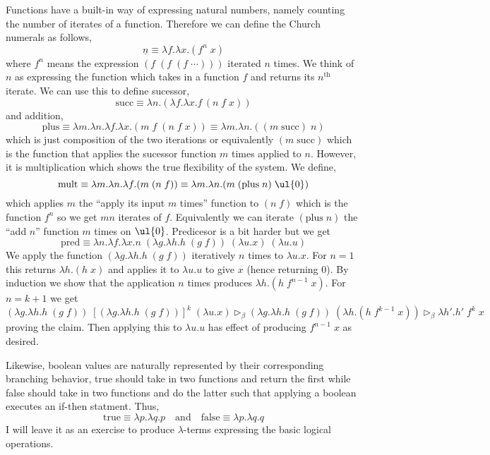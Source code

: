 \documentclass[12pt]{article}
\newcommand{\red}{\triangleright}
\newcommand{\bred}{\red_{\beta}}
\begin{document}
Functions have a built-in way of expressing natural numbers, namely counting the number of iterates of a function. Therefore we can define the Church numerals as follows,
\[ \underline{n} \equiv \lambda f . \lambda x . (f^n \; x) \]
where $f^n$ means the expression $(f \; (f \; (f \; \cdots)))$ iterated $n$ times. We think of $n$ as expressing the function which takes in a function $f$ and returns its $n^{\text{th}}$ iterate. We can use this to define sucessor,
\[ \text{succ} \equiv \lambda n . (\lambda f . \lambda x. f \, (n \; f \; x)) \]
and addition,
\[ \text{plus} \equiv \lambda m . \lambda n. \lambda f. \lambda x . (m \; f \; (n \; f \; x)) \equiv \lambda m . \lambda n . ((m \; \text{succ}) \; n) \]
which is just composition of the two iterations or equivalently $(m \; \text{succ})$ which is the function that applies the sucessor function $m$ times applied to $n$. However, it is multiplication which shows the true flexibility of the system. We define,
\[ \text{mult} \equiv \lambda m . \lambda n . \lambda f . (m \; (n \; f)) \equiv \lambda m . \lambda n . (m \; (\text{plus} \; n) \; \ul{0}) \]
which applies $m$ the ``apply its input $m$ times'' function to $(n \; f)$ which is the function $f^n$ so we get $mn$ iterates of $f$. Equivalently we can iterate $(\text{plus} \; n)$ the ``add $n$'' function $m$ times on $\ul{0}$. Predicesor is a bit harder but we get
\[ \text{pred} \equiv \lambda n. \lambda f. \lambda x. n \; (\lambda g . \lambda h . h \; (g \; f)) \; (\lambda u.x) \; (\lambda u . u) \]
We apply the function $(\lambda g . \lambda h . h \; (g \; f))$ iteratively $n$ times to $\lambda u.x$. For $n = 1$ this returns $\lambda h . (h \; x)$ and applies it to $\lambda u . u$ to give $x$ (hence returning $0$). By induction we show that the application $n$ times produces $\lambda h . (h \; f^{n-1} \; x)$. For $n = k+1$ we get 
\[ (\lambda g . \lambda h . h \; (g \; f)) \; [(\lambda g . \lambda h . h \; (g \; f))]^k \; (\lambda u.x) \bred (\lambda g . \lambda h . h \; (g \; f)) \; (\lambda h . (h \; f^{k-1} \; x)) \bred \lambda h' . h' \; f^k \; x  \]
proving the claim. Then applying this to $\lambda u . u$ has effect of producing $f^{n-1} \; x$ as desired.
\par 
Likewise, boolean values are naturally represented by their corresponding branching behavior, true should take in two functions and return the first while false should take in two functions and do the latter such that applying a boolean executes an if-then statment. Thus,
\[ \text{true} \equiv \lambda p . \lambda q . p \quad \text{and} \quad \text{false} \equiv \lambda p . \lambda q . q \]
I will leave it as an exercise to produce $\lambda$-terms expressing the basic logical operations. 
\end{document}

